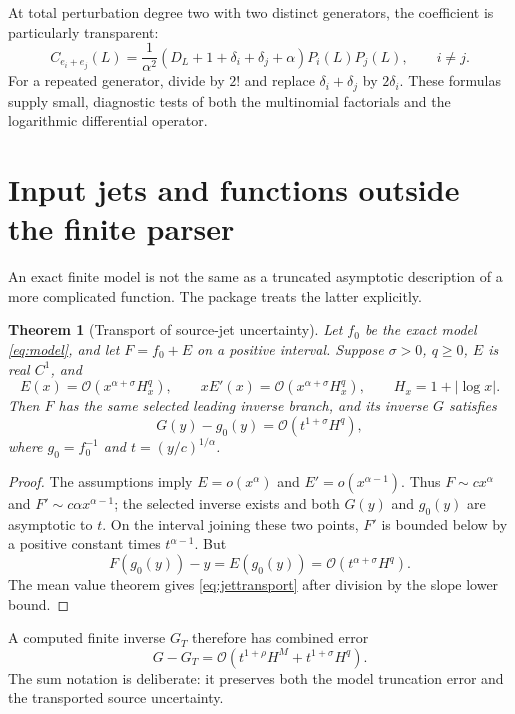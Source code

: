 \documentclass[11pt,a4paper]{article}
\numberwithin{equation}{section}
\newtheorem{theorem}{Theorem}[section]
\theoremstyle{definition}\newtheorem{definition}[theorem]{Definition}
\theoremstyle{remark}\newtheorem{remark}[theorem]{Remark}
\newcommand{\OO}{\mathcal O}\newcommand{\Id}{\mathrm{id}}
\begin{document}
At total perturbation degree two with two distinct generators, the coefficient is particularly transparent:
\[
C_{e_i+e_j}(L)=\frac1{\alpha^2}
\left(D_L+1+\delta_i+\delta_j+\alpha\right)
P_i(L)P_j(L),\qquad i\ne j.
\]
For a repeated generator, divide by $2!$ and replace $\delta_i+\delta_j$ by $2\delta_i$. These formulas supply small, diagnostic tests of both the multinomial factorials and the logarithmic differential operator.

\section{Input jets and functions outside the finite parser}
\label{sec:jets}
An exact finite model is not the same as a truncated asymptotic description of a more complicated function. The package treats the latter explicitly.

\begin{theorem}[Transport of source-jet uncertainty]\label{thm:jet}
Let $f_0$ be the exact model \eqref{eq:model}, and let $F=f_0+E$ on a positive interval. Suppose $\sigma>0$, $q\ge0$, $E$ is real $C^1$, and
\begin{equation}\label{eq:jetassump}
E(x)=\OO(x^{\alpha+\sigma}H_x^q),\qquad
xE'(x)=\OO(x^{\alpha+\sigma}H_x^q),\qquad
H_x=1+|\log x|.
\end{equation}
Then $F$ has the same selected leading inverse branch, and its inverse $G$ satisfies
\begin{equation}\label{eq:jettransport}
G(y)-g_0(y)=\OO(t^{1+\sigma}H^q),
\end{equation}
where $g_0=f_0^{-1}$ and $t=(y/c)^{1/\alpha}$.
\end{theorem}
\begin{proof}
The assumptions imply $E=o(x^\alpha)$ and $E'=o(x^{\alpha-1})$. Thus $F\sim cx^\alpha$ and $F'\sim c\alpha x^{\alpha-1}$; the selected inverse exists and both $G(y)$ and $g_0(y)$ are asymptotic to $t$. On the interval joining these two points, $F'$ is bounded below by a positive constant times $t^{\alpha-1}$. But
\[
F(g_0(y))-y=E(g_0(y))=\OO(t^{\alpha+\sigma}H^q).
\]
The mean value theorem gives \eqref{eq:jettransport} after division by the slope lower bound.
\end{proof}

A computed finite inverse $G_T$ therefore has combined error
\begin{equation}\label{eq:combinederror}
G-G_T=\OO\!\left(t^{1+\rho}H^M+t^{1+\sigma}H^q\right).
\end{equation}
The sum notation is deliberate: it preserves both the model truncation error and the transported source uncertainty.
\end{document}
